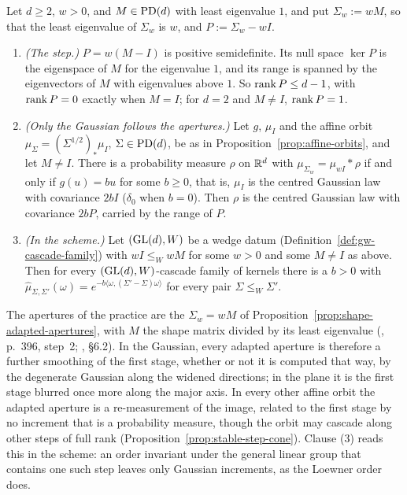 \begin{proposition}\label{prop:shape-adapted-apertures}
Let $d \ge 2$, $w > 0$, and $M \in \mathrm{PD}(d)$ with least eigenvalue $1$, and put $\Sigma_w := wM$, so that
the least eigenvalue of $\Sigma_w$ is $w$, and $P := \Sigma_w - wI$.
\begin{enumerate}
\item \emph{(The step.)} $P = w(M - I)$ is positive semidefinite. Its null space $\ker P$ is the eigenspace of $M$ for
the eigenvalue $1$, and its range is spanned by the eigenvectors of $M$ with eigenvalues above $1$. So
$\operatorname{rank} P \le d - 1$, with $\operatorname{rank} P = 0$ exactly when $M = I$; for $d = 2$ and $M \ne I$, $\operatorname{rank} P = 1$.
\item \emph{(Only the Gaussian follows the apertures.)} Let $g$, $\mu_I$ and the affine orbit
$\mu_\Sigma = (\Sigma^{1/2})_*\mu_I$, $\Sigma \in \mathrm{PD}(d)$, be as in Proposition~\ref{prop:affine-orbits}, and let
$M \ne I$. There is a probability measure $\rho$ on $\mathbb{R}^d$ with $\mu_{\Sigma_w} = \mu_{wI} * \rho$ if and
only if $g(u) = bu$ for some $b \ge 0$, that is, $\mu_I$ is the centred Gaussian law with covariance $2bI$
($\delta_0$ when $b = 0$). Then $\rho$ is the centred Gaussian law with covariance $2bP$, carried by the
range of $P$.
\item \emph{(In the scheme.)} Let $(\mathrm{GL}(d), W)$ be a wedge datum (Definition~\ref{def:gw-cascade-family}) with
$wI \le_W wM$ for some $w > 0$ and some $M \ne I$ as above. Then for every $(\mathrm{GL}(d), W)$-cascade family
of kernels there is a $b > 0$ with $\widehat\mu_{\Sigma,\Sigma'}(\omega) =
e^{-b\langle\omega,(\Sigma'-\Sigma)\omega\rangle}$ for every pair $\Sigma \le_W \Sigma'$.
\end{enumerate}
\end{proposition}

The apertures of the practice are the $\Sigma_w = wM$ of
Proposition~\ref{prop:shape-adapted-apertures}, with $M$ the shape matrix divided
by its least eigenvalue (, p.~396, step~2; , \S6.2).
In the Gaussian, every adapted aperture is therefore a further smoothing of the first stage, whether or not
it is computed that way, by the degenerate Gaussian along the widened directions; in the plane it is the
first stage blurred once more along the major axis. In every other affine orbit the adapted aperture is a
re-measurement of the image, related to the first stage by no increment that is a probability measure,
though the orbit may cascade along other steps of full rank (Proposition~\ref{prop:stable-step-cone}).
Clause (3) reads this in the scheme: an order invariant under the general linear group that contains one
such step leaves only Gaussian increments, as the Loewner order does.


